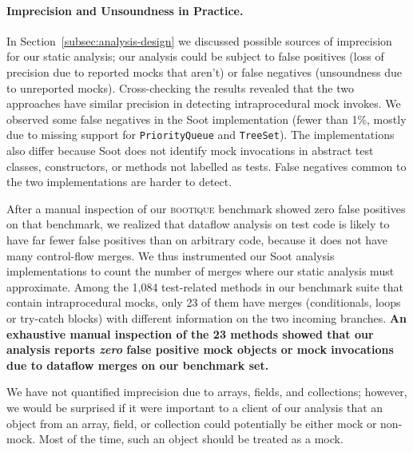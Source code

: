 \paragraph{Imprecision and Unsoundness in Practice.} In Section~\ref{subsec:analysis-design} we discussed possible sources of imprecision for our static analysis; our analysis could be subject to false positives (loss of precision due to reported mocks that aren't) or false negatives (unsoundness due to unreported mocks). Cross-checking the results revealed that the two approaches have similar precision in detecting intraprocedural mock invokes. We observed some false negatives in the Soot implementation (fewer than 1\%, mostly due to missing support for \texttt{PriorityQueue} and \texttt{TreeSet}). The implementations also differ because Soot does not identify mock invocations in abstract test classes, constructors, or methods not labelled as tests. False negatives common to the two implementations are harder to detect.

After a manual inspection of our \textsc{bootique} benchmark showed zero false positives on that benchmark, we realized that dataflow analysis on test code is likely to have far fewer false positives than on arbitrary code, because it does not have many control-flow merges. We thus instrumented our Soot analysis implementations to count the number of merges where our static analysis must approximate. Among the 1,084 test-related methods in our benchmark suite that contain intraprocedural mocks, only 23 of them have merges (conditionals, loops or try-catch blocks) with different information on the two incoming branches.  {\bf An exhaustive manual inspection of the 23 methods showed that our analysis reports \emph{zero} false positive mock objects or mock invocations due to dataflow merges on our benchmark set.}

We have not quantified imprecision due to arrays, fields, and collections; however, we would be surprised if it were important to a client of our analysis that an object from an array, field, or collection could potentially be either mock or non-mock. Most of the time, such an object should be treated as a mock.



